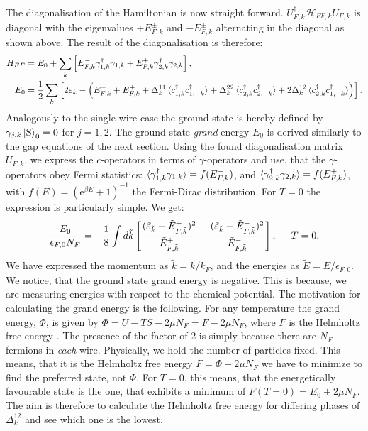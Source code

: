 The diagonalisation of the Hamiltonian is now straight forward. $U^\dagger_{F,k}\mathcal{H}_{FF,k}U_{F,k}$ is diagonal with the eigenvalues $+E^{\pm}_{F,k}$ and $-E^{\pm}_{F,k}$ alternating in the diagonal as shown above. The result of the diagonalisation is therefore:
\begin{align}
H_{FF} &= E_0 + \sum_{k} \left[ E^{-}_{F,k}\gamma^\dagger_{1, k}\gamma_{1, k} + E^{+}_{F,k}\gamma^\dagger_{2, k}\gamma_{2, k} \right], \nonumber \\ 
E_0 &= \frac{1}{2}\sum_k \left[2\varepsilon_k - \left( E^{-}_{F,k} + E^{+}_{F,k} + \Delta^{11}_k\braket{c^\dagger_{1,k}c^\dagger_{1,-k}} + \Delta^{22}_k\braket{c^\dagger_{2,k}c^\dagger_{2,-k}} + 2\Delta^{12}_k\braket{c^\dagger_{2,k}c^\dagger_{1,-k}} \right) \right]. 
\label{eq.2wiresDiagonalisedHamiltonian}
\end{align}  
Analogously to the single wire case the ground state is hereby defined by $\gamma_{j,k}\ket{\text{S}}_0 = 0$ for $j = 1, 2$. The ground state \textit{grand} energy $E_0$ is derived similarly to the gap equations of the next section. Using the found diagonalisation matrix $U_{F,k}$, we express the $c$-operators in terms of $\gamma$-operators and use, that the $\gamma$-operators obey Fermi statistics: $\braket{\gamma^\dagger_{1,k}\gamma_{1,k}} = f(E^{-}_{F,k})$, and $\braket{\gamma^\dagger_{2,k}\gamma_{2,k}} = f(E^{+}_{F,k})$, with $f(E) = (\text{e}^{\beta E} + 1)^{-1}$ the Fermi-Dirac distribution. For $T=0$ the expression is particularly simple. We get:
\begin{equation}
\frac{E_0}{\epsilon_{F,0} N_F} = -\frac{1}{8} \int d\tilde{k} \left[\frac{(\tilde{\varepsilon}_{\tilde{k}} - \tilde{E}^{+}_{F, \tilde{k}})^2}{\tilde{E}^{+}_{F, \tilde{k}}} + \frac{(\tilde{\varepsilon}_{\tilde{k}} - \tilde{E}^{-}_{F, \tilde{k}})^2}{\tilde{E}^{-}_{F, \tilde{k}}}\right], \hspace{0.5cm} T = 0. 
\label{eq.2wiresGrandGroundStateEnergy}
\end{equation}
We have expressed the momentum as $\tilde{k} = k/k_F$, and the energies as $\tilde{E} = E/\epsilon_{F,0}$. We notice, that the ground state grand energy is negative. This is because, we are measuring energies with respect to the chemical potential. The motivation for calculating the grand energy is the following. For any temperature the grand energy, $\Phi$, is given by $\Phi = U - TS - 2\mu N_F = F - 2\mu N_F$, where $F$ is the Helmholtz free energy \cite{SchroederThermal}. The presence of the factor of 2 is simply because there are $N_F$ fermions in \textit{each} wire. Physically, we hold the number of particles fixed. This means, that it is the Helmholtz free energy $F = \Phi + 2\mu N_F$ we have to minimize to find the preferred state, not $\Phi$. For $T = 0$, this means, that the energetically favourable state is the one, that exhibits a minimum of $F(T = 0) = E_0 + 2\mu N_F$. The aim is therefore to calculate the Helmholtz free energy for differing phases of $\Delta^{12}_k$ and see which one is the lowest. 

